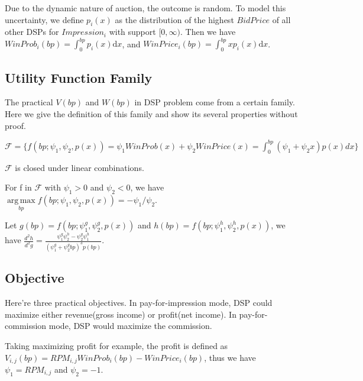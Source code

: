 \documentclass[sigconf]{acmart}
\DeclareMathOperator*{\argmax}{arg\,max}
\newcommand{\sV}{V_{i,j}}
\newcommand{\sRPM}{RPM_{i,j}}
\newcommand{\pprob}{\psi_1}
\newcommand{\pprice}{\psi_2}
\newcommand{\uff}{\mathscr{F}}
\newcommand{\uf}{f(bp; \pprob, \pprice, p(x))}
\begin{document}
Due to the dynamic nature of auction, the outcome is random.
To model this uncertainty, we define $p_i(x)$ as
   the distribution of the highest $BidPrice$ of all other DSPs for $Impression_i$ with support $[0, \infty)$.
Then we have $WinProb_i(bp)=\int_0^{bp} p_i(x) \mathrm{d} x$, and $WinPrice_i(bp)=\int_0^{bp} x p_i(x) \mathrm{d} x$.

\subsection{Utility Function Family}

The practical $V(bp)$ and $W(bp)$ in DSP problem come from a certain family.
Here we give the definition of this family and show its several properties without proof.

\begin{definition}
$\uff = \{ \uf = \pprob WinProb(x) + \pprice WinPrice(x) = \int_0^{bp} (\pprob + \pprice x)p(x)dx \} $
\end{definition}

\begin{theorem}
$\uff$ is closed under linear combinations.
\end{theorem}

\begin{theorem}
For f in $\uff$ with $\pprob > 0$ and $\pprice < 0$, we have $\argmax\limits_{bp} \uf = - \pprob / \pprice$.
\end{theorem}

\begin{theorem}
Let $g(bp)=f(bp;\pprob^g,\pprice^g,p(x))$ and $h(bp)=f(bp;\pprob^h,\pprice^h,p(x))$,
    we have $\frac{d^2h}{d^2g} = \frac{\pprob^g \pprice^h - \pprice^g \pprob^h}{(\pprob^g + \pprice^g bp)^3 p(bp)}$.
\end{theorem}

\subsection{Objective}

Here're three practical objectives.
In pay-for-impression mode, DSP could maximize either revenue(gross income) or profit(net income).
In pay-for-commission mode, DSP would maximize the commission. 

Taking maximizing profit for example, the profit is defined as $\sV(bp)=\sRPM{}WinProb_i(bp)-WinPrice_i(bp)$,
    thus we have $\pprob=\sRPM$ and $\pprice=-1$.
\end{document}
